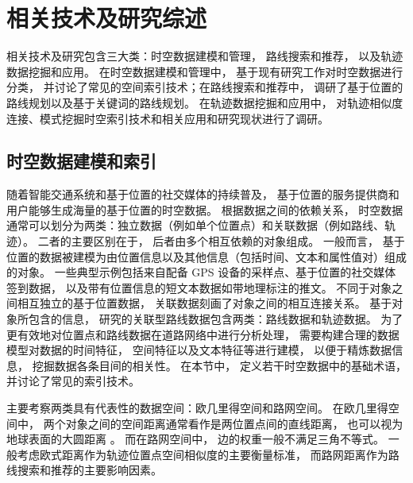 \chapter{相关技术及研究综述}
相关技术及研究包含三大类：时空数据建模和管理， 路线搜索和推荐， 以及轨迹数据挖掘和应用。 在时空数据建模和管理中， 基于现有研究工作对时空数据进行分类， 并讨论了常见的空间索引技术；在路线搜索和推荐中， 调研了基于位置的路线规划以及基于关键词的路线规划。 在轨迹数据挖掘和应用中， 对轨迹相似度连接、模式挖掘时空索引技术和相关应用和研究现状进行了调研。

\section{时空数据建模和索引}
随着智能交通系统和基于位置的社交媒体的持续普及， 基于位置的服务提供商和用户能够生成海量的基于位置的时空数据。 根据数据之间的依赖关系， 时空数据通常可以划分为两类：独立数据（例如单个位置点）和关联数据（例如路线、轨迹）。 二者的主要区别在于， 后者由多个相互依赖的对象组成。
一般而言， 基于位置的数据被建模为由位置信息以及其他信息（包括时间、文本和属性值对）组成的对象。 一些典型示例包括来自配备 GPS 设备的采样点、基于位置的社交媒体签到数据， 以及带有位置信息的短文本数据如带地理标注的推文。
不同于对象之间相互独立的基于位置数据， 关联数据刻画了对象之间的相互连接关系。
基于对象所包含的信息， 研究的关联型路线数据包含两类：路线数据和轨迹数据。 为了更有效地对位置点和路线数据在道路网络中进行分析处理， 需要构建合理的数据模型对数据的时间特征， 空间特征以及文本特征等进行建模， 以便于精炼数据信息， 挖掘数据各条目间的相关性。 在本节中， 定义若干时空数据中的基础术语， 并讨论了常见的索引技术。

\begin{definition}[数据空间]
    主要考察两类具有代表性的数据空间：欧几里得空间和路网空间。 在欧几里得空间中， 两个对象之间的空间距离通常看作是两位置点间的直线距离， 也可以视为地球表面的大圆距离 。 而在路网空间中， 边的权重一般不满足三角不等式。 一般考虑欧式距离作为轨迹位置点空间相似度的主要衡量标准， 而路网距离作为路线搜索和推荐的主要影响因素。
\end{definition}

